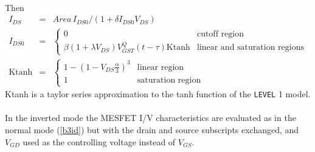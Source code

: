 \hspace*{\fill}\\[0.1in]
Then
\begin{eqnarray}
I_{DS} &=&  Area\, {{\textstyle I_{DS0}}/ {\left( \textstyle 1 + \delta I_{DS0} V_{DS}
           \right) }} \label{b3id} \\
I_{DS0} &=& \left\{ \begin{array}{ll}
      0  & \mbox{cutoff region} \\
      \beta (1 + \lambda V_{DS})
      V^Q_{GST}(t-\tau)
      \mbox{Ktanh}
         &\mbox{linear and saturation regions} \end{array} \right. \\ %
\mbox{Ktanh} &=& \left\{ \begin{array}{ll}
       1 - \left(1 - V_{DS} \frac{\textstyle\alpha}{\textstyle 3}\right)^3
        & \mbox{linear region} \\
      1
         &\mbox{saturation region} \end{array} \right. %
\end{eqnarray}
Ktanh is a taylor series approximation to the tanh function
of the {\tt LEVEL} 1 model.
\\[0.1in]
\\[0.2in]
In the inverted mode the MESFET I/V characteristics are evaluated as in the
normal mode (\ref{b3id}) but with the drain and source subscripts
exchanged, and $V_{GD}$ used as the controlling voltage instead of $V_{GS}$.
%
%
